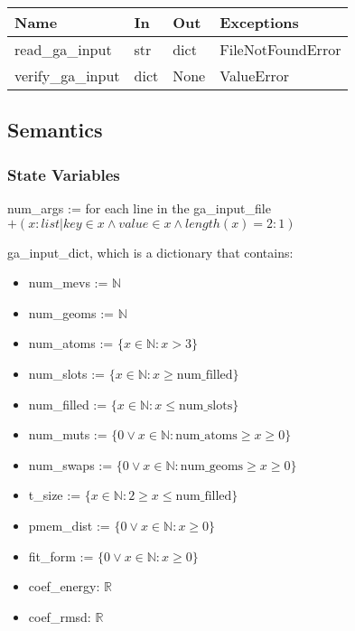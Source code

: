 \documentclass[12pt, titlepage]{article}
\begin{document}
\begin{table}[H]
	\begin{tabular}{p{4cm} p{2cm} p{2cm} p{5cm}}
		\toprule
		\textbf{Name} & \textbf{In} & \textbf{Out} & \textbf{Exceptions} \\
		\hline
		read\_ga\_input   & str  & dict & FileNotFoundError \\
		verify\_ga\_input & dict & None    & ValueError \\
		\bottomrule
	\end{tabular}
\end{table}
\subsection{Semantics}

\subsubsection{State Variables}

\noindent num\_args := for each line in the ga\_input\_file $+(x : list | key 
\in x \land value \in x \land 
length(x) = 2 : 1)$ \\ 

\noindent ga\_input\_dict, which is a dictionary that contains:
\begin{itemize}
\item num\_mevs := $\mathbb{N}$
\item num\_geoms := $\mathbb{N}$
\item num\_atoms := $\{x \in \mathbb{N}: x > 3\}$
\item num\_slots := $\{x \in \mathbb{N}: x \geq \text{num\_filled} \}$
\item num\_filled := $\{x \in \mathbb{N}: x \leq \text{num\_slots}\}$
\item num\_muts := $\{0 \lor x \in \mathbb{N}: \text{num\_atoms} \geq x \geq 
0\}$
\item num\_swaps := $\{0 \lor x \in \mathbb{N}: \text{num\_geoms} \geq x \geq 
0\}$
\item t\_size := $\{x \in \mathbb{N}: 2 \geq x \leq \text{num\_filled} \}$
\item pmem\_dist := $\{0 \lor x \in \mathbb{N}: x \geq 0\}$
\item fit\_form := $\{0 \lor x \in \mathbb{N}: x \geq 0\}$
\item coef\_energy: $\mathbb{R}$
\item coef\_rmsd: $\mathbb{R}$
\end{itemize}
\end{document}
